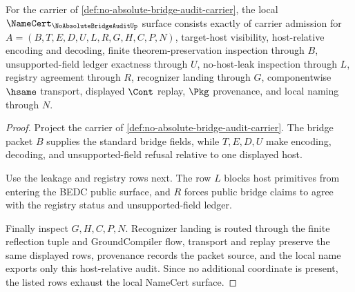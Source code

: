 \begin{theorem}
\label{thm:no-absolute-bridge-audit-namecert-obligations}
For the carrier of \autoref{def:no-absolute-bridge-audit-carrier}, the local $\NameCert_{\NoAbsoluteBridgeAuditUp}$ surface consists exactly of carrier admission for $A=(B,T,E,D,U,L,R,G,H,C,P,N)$, target-host visibility, host-relative encoding and decoding, finite theorem-preservation inspection through $B$, unsupported-field ledger exactness through $U$, no-host-leak inspection through $L$, registry agreement through $R$, recognizer landing through $G$, componentwise $\hsame$ transport, displayed $\Cont$ replay, $\Pkg$ provenance, and local naming through $N$.
\end{theorem}
\begin{proof}
Project the carrier of \autoref{def:no-absolute-bridge-audit-carrier}. The bridge packet $B$ supplies the standard bridge fields, while $T,E,D,U$ make encoding, decoding, and unsupported-field refusal relative to one displayed host.

Use the leakage and registry rows next. The row $L$ blocks host primitives from entering the BEDC public surface, and $R$ forces public bridge claims to agree with the registry status and unsupported-field ledger.

Finally inspect $G,H,C,P,N$. Recognizer landing is routed through the finite reflection tuple and GroundCompiler flow, transport and replay preserve the same displayed rows, provenance records the packet source, and the local name exports only this host-relative audit. Since no additional coordinate is present, the listed rows exhaust the local NameCert surface.
\end{proof}



